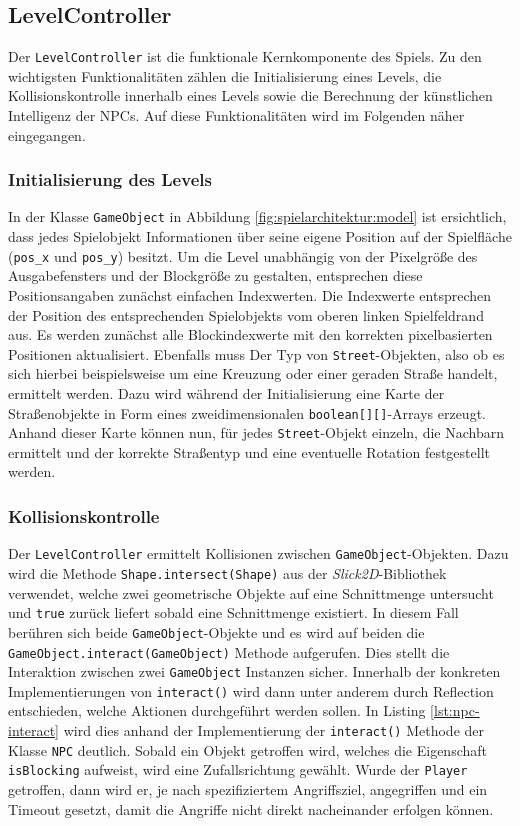 \subsection{LevelController}

Der \texttt{LevelController} ist die funktionale Kernkomponente des Spiels.
Zu den wichtigsten Funktionalitäten zählen die Initialisierung eines Levels, die Kollisionskontrolle innerhalb eines Levels sowie die Berechnung der künstlichen Intelligenz der NPCs.
Auf diese Funktionalitäten wird im Folgenden näher eingegangen.

\subsubsection{Initialisierung des Levels}
In der Klasse \texttt{GameObject} in Abbildung \ref{fig:spielarchitektur:model} ist ersichtlich, dass jedes Spielobjekt Informationen über seine eigene Position auf der Spielfläche (\texttt{pos\_x} und \texttt{pos\_y}) besitzt.
Um die Level unabhängig von der Pixelgröße des Ausgabefensters und der Blockgröße zu gestalten, entsprechen diese Positionsangaben zunächst einfachen Indexwerten.
Die Indexwerte entsprechen der Position des entsprechenden Spielobjekts vom oberen linken Spielfeldrand aus.
Es werden zunächst alle Blockindexwerte mit den korrekten pixelbasierten Positionen aktualisiert.
Ebenfalls muss Der Typ von \texttt{Street}-Objekten, also ob es sich hierbei beispielsweise um eine Kreuzung oder einer geraden Straße handelt, ermittelt werden.
Dazu wird während der Initialisierung eine Karte der Straßenobjekte in Form eines zweidimensionalen \texttt{boolean[][]}-Arrays erzeugt.
Anhand dieser Karte können nun, für jedes \texttt{Street}-Objekt einzeln, die Nachbarn ermittelt und der korrekte Straßentyp und eine eventuelle Rotation festgestellt werden.

\subsubsection{Kollisionskontrolle}
Der \texttt{LevelController} ermittelt Kollisionen zwischen \texttt{GameObject}-Objekten.
Dazu wird die Methode \texttt{Shape.intersect(Shape)} aus der \textit{Slick2D}-Bibliothek verwendet, welche zwei geometrische Objekte auf eine Schnittmenge untersucht und \texttt{true} zurück liefert sobald eine Schnittmenge existiert.
In diesem Fall berühren sich beide \texttt{GameObject}-Objekte und es wird auf beiden die \texttt{GameObject.interact(GameObject)} Methode aufgerufen.
Dies stellt die Interaktion zwischen zwei \texttt{GameObject} Instanzen sicher.
Innerhalb der konkreten Implementierungen von \texttt{interact()} wird dann unter anderem durch Reflection entschieden, welche Aktionen durchgeführt werden sollen.
In Listing \ref{lst:npc-interact} wird dies anhand der Implementierung der \texttt{interact()} Methode der Klasse \texttt{NPC} deutlich.
Sobald ein Objekt getroffen wird, welches die Eigenschaft \texttt{isBlocking} aufweist, wird eine Zufallsrichtung gewählt.
Wurde der \texttt{Player} getroffen, dann wird er, je nach spezifiziertem Angriffsziel, angegriffen und ein Timeout gesetzt, damit die Angriffe nicht direkt nacheinander erfolgen können.

